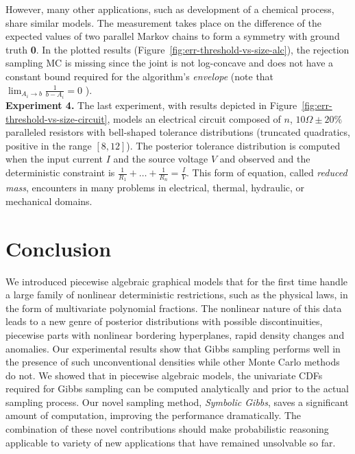 \documentclass{article}
\begin{document}
However, many other applications, such as development of a chemical process, share similar models.  
The measurement takes place on the difference of the expected values of two parallel Markov chains to form a symmetry with ground truth \textbf{0}.
In the plotted results (Figure~\ref{fig:err-threshold-vs-size-alc}), 
the rejection sampling MC is missing since the joint is not log-concave and does not have a constant bound required for the algorithm's \emph{envelope} 
(note that $\lim_{A_{i} \rightarrow b} \frac{1}{b - A_{i}} = 0$ ).
\\
\textbf{Experiment 4.} The last experiment, with results depicted in 
Figure~\ref{fig:err-threshold-vs-size-circuit}, models an electrical circuit composed of $n$, $10\Omega\pm20\%$ paralleled resistors with bell-shaped tolerance distributions (truncated quadratics, positive in the range $[8, 12]$). The posterior tolerance distribution is computed when 
the input current $I$ and the source voltage $V$ and observed and the deterministic constraint is $\frac{1}{R_1} + \ldots + \frac{1}{R_n} = \frac{I}{V}$.
This form of equation, called \emph{reduced mass}, encounters in many problems in electrical, thermal, hydraulic, or mechanical domains. 

\section{Conclusion}

We introduced piecewise algebraic graphical models that for the first time handle a large family of nonlinear deterministic restrictions, such as the physical laws, in the form of multivariate polynomial fractions. The nonlinear nature of this data leads to a new genre of posterior distributions with possible discontinuities, 
piecewise parts with nonlinear bordering hyperplanes, rapid density changes and anomalies. Our experimental results show that Gibbs sampling performs well in the presence of such unconventional densities while other Monte Carlo methods do not. We showed that in piecewise algebraic models, the univariate CDFs required for Gibbs sampling can be computed analytically and prior to the actual sampling process. Our novel sampling method, \emph{Symbolic Gibbs}, saves a significant amount of computation, improving the performance dramatically. The combination of these novel contributions should make probabilistic reasoning applicable to variety of new applications that have remained unsolvable so far.      


\end{document}
